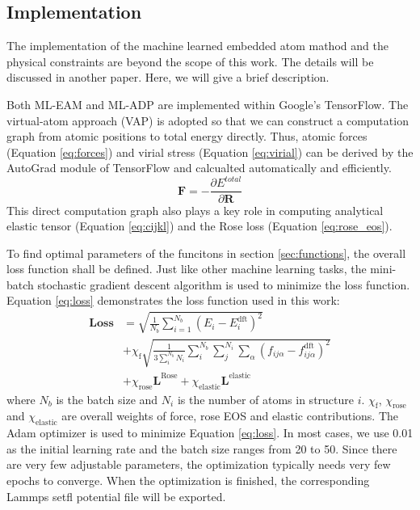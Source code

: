 \documentclass[prb,reprint]{revtex4-2}
\begin{document}
\subsection{Implementation}
\label{sec:implementation}

The implementation of the machine learned embedded atom mathod and the physical
constraints are beyond the scope of this work. The details will be discussed
in another paper. Here, we will give a brief description.

Both ML-EAM and ML-ADP are implemented within Google's TensorFlow. The 
virtual-atom approach (VAP) is adopted so that we can construct a computation 
graph from atomic positions to total energy directly. Thus, atomic forces 
(Equation \ref{eq:forces}) and virial stress (Equation \ref{eq:virial}) can be 
derived by the AutoGrad module of TensorFlow and calcualted automatically and 
efficiently. 
\begin{equation}
\label{eq:forces}
\mathbf{F} = -\frac{\partial E^{total}}{\partial \mathbf{R}}
\end{equation}
This direct computation graph also plays a key role in computing analytical 
elastic tensor (Equation \ref{eq:cijkl}) and the Rose loss 
(Equation \ref{eq:rose_eos}).
 
To find optimal parameters of the funcitons in section \ref{sec:functions}, the 
overall loss function shall be defined. Just like other machine learning tasks, 
the mini-batch stochastic gradient descent algorithm is used to minimize the 
loss function. Equation \ref{eq:loss} demonstrates the loss function used in 
this work:
\begin{align}
\label{eq:loss}
\mathbf{Loss} & = \sqrt{\frac{1}{N_{b}}\sum_{i=1}^{N_{b}}{\left(
    E_{i} - E_{i}^{\mathrm{dft}}
\right)^2}} \nonumber \\
& + \chi_{\mathrm{f}}\sqrt{
    \frac{1}{3\sum_{i}^{N_{b}}{N_i}}\sum_{i}^{N_b}{\sum_{j}^{N_i}{
        \sum_{\alpha}{
            \left(f_{ij\alpha} - f_{ij\alpha}^{\mathrm{dft}}\right)^2
        }
    }}
} \nonumber \\
& + \chi_{\mathrm{rose}}\mathbf{L}^{\mathrm{Rose}} 
+ \chi_{\mathrm{elastic}}\mathbf{L}^{\mathrm{elastic}}
\end{align} 
where $N_{b}$ is the batch size and $N_i$ is the number of atoms in structure 
$i$. $\chi_{\mathrm{f}}$, $\chi_{\mathrm{rose}}$ and $\chi_{\mathrm{elastic}}$ 
are overall weights of force, rose EOS and elastic contributions. 
The Adam optimizer \cite{adam} is used to minimize Equation \ref{eq:loss}. 
In most cases, we use 0.01 as the initial learning rate and the batch size 
ranges from 20 to 50. Since there are very few adjustable parameters, the 
optimization typically needs very few epochs to converge. When the optimization 
is finished, the corresponding Lammps setfl potential file will be exported.
\end{document}
